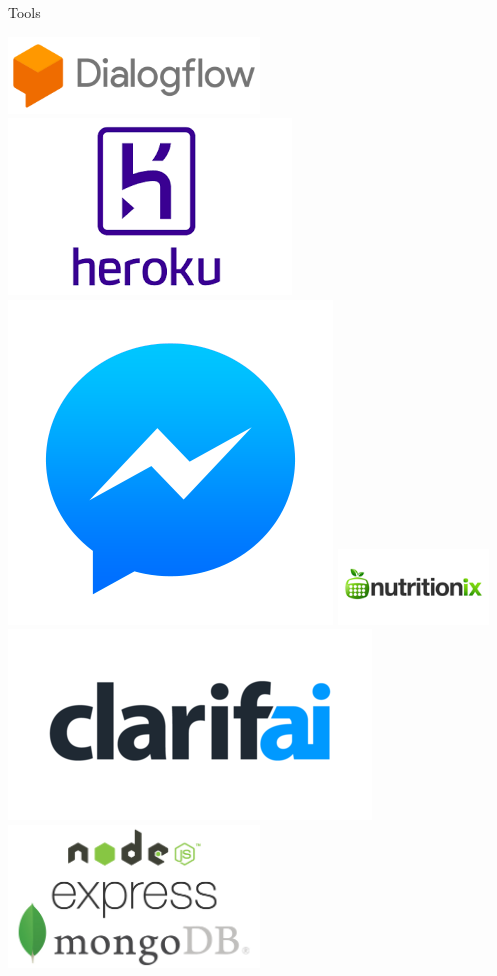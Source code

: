 \documentclass[landscape]{infslides}
\begin{document}
\begin{slide}{Tools}
    \begin{multicols}{2}
        \includegraphics[width=0.5\textwidth]{dialogflow_logo.png}
        \includegraphics[height=0.3\textheight]{heroku_logo.png}
        \includegraphics[height=0.3\textheight]{messenger_logo.png}
        \includegraphics[width=0.3\textwidth,left]{nutritionix_logo.png}
        \includegraphics[height=0.3\textheight,left]{clarifai_logo.png}
        \includegraphics[width=0.5\textwidth]{men_stack.jpg}
    \end{multicols}
\end{slide}
\end{document}
